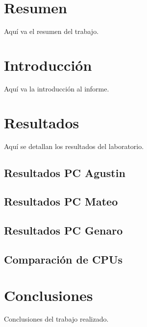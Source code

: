 \documentclass[a4paper,12pt]{article}
\begin{document}


\section{Resumen}
Aquí va el resumen del trabajo.

\section{Introducción}
Aquí va la introducción al informe.

\newpage

\section{Resultados}
Aquí se detallan los resultados del laboratorio.

\subsection{Resultados PC Agustin}


\newpage

\subsection{Resultados PC Mateo}


\newpage

\subsection{Resultados PC Genaro}


\newpage

\subsection{Comparación de CPUs}


\newpage

\section{Conclusiones}
Conclusiones del trabajo realizado.
\end{document}
